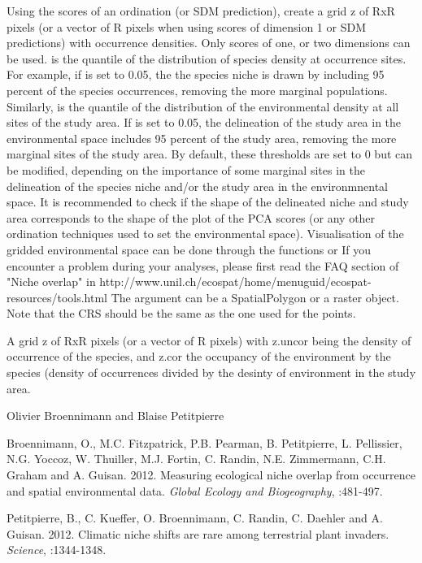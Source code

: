 \documentclass[a4paper]{book}
\begin{document}
\begin{Details}\relax
Using the scores of an ordination (or SDM prediction), create a grid z of RxR pixels (or a vector of R pixels when using scores of dimension 1 or SDM predictions) with occurrence densities. Only scores of one, or two dimensions can be used.
 is the quantile of the distribution of species density at occurrence sites. 
For example, if  is set to 0.05, the the species niche is drawn by including 95 percent of the species occurrences, removing the more marginal populations. 
Similarly,  is the quantile of the distribution of the environmental density at all sites of the study area. 
If  is set to 0.05, the delineation of the study area in the environmental space includes 95 percent  of the study area, removing the more marginal sites of the study area. 
By default, these thresholds are set to 0 but can be modified, depending on the importance of some marginal sites in the delineation of the species niche and/or the study area in the environmnental space. It is recommended to check if the shape of the delineated niche and study area corresponds to the shape of the plot of the PCA scores (or any other ordination techniques used to set the environmental space). 
Visualisation of the gridded environmental space can be done through the functions  or 
If you encounter a problem during your analyses, please first read the FAQ section of "Niche overlap" in http://www.unil.ch/ecospat/home/menuguid/ecospat-resources/tools.html
The argument  can be a SpatialPolygon or a raster object. 
Note that the CRS should be the same as the one used for the points.
\end{Details}
%
\begin{Value}
A grid z of RxR pixels (or a vector of R pixels) with z.uncor being the density of occurrence of the species, and z.cor the occupancy of the environment by the species (density of occurrences divided by the desinty of environment in the study area.
\end{Value}
%
\begin{Author}\relax
Olivier Broennimann  and Blaise Petitpierre 
\end{Author}
%
\begin{References}\relax
Broennimann, O., M.C. Fitzpatrick, P.B. Pearman, B. Petitpierre, L. Pellissier, N.G. Yoccoz, W. Thuiller, M.J. Fortin, C. Randin, N.E. Zimmermann, C.H. Graham and A. Guisan. 2012. Measuring ecological niche overlap from occurrence and spatial environmental data. \emph{Global Ecology and Biogeography}, :481-497.


Petitpierre, B., C. Kueffer, O. Broennimann, C. Randin, C. Daehler and A. Guisan. 2012. Climatic niche shifts are rare among terrestrial plant invaders. \emph{Science}, :1344-1348.
\end{References}
\end{document}
